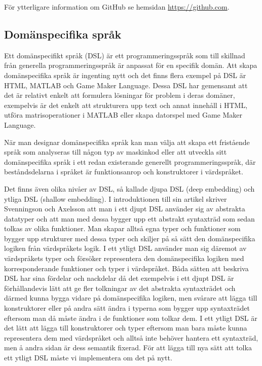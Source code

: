\documentclass[]{article}
\begin{document}
För ytterligare information om GitHub se hemsidan \url{https://github.com}.


\subsection{Domänspecifika språk}
Ett domänspecifikt språk (\gls{DSL}) är ett programmeringsspråk som till
skillnad från generella programmeringsspråk är anpassat för en
specifik domän. Att skapa domänspecifika språk är ingenting nytt och det
finns flera exempel på DSL är HTML, MATLAB och Game Maker Language.
Dessa DSL har gemensamt att det är relativt enkelt att formulera lösningar för
problem i deras domäner, exempelvis är det enkelt att strukturera upp text och
annat innehåll i HTML, utföra matrisoperationer i MATLAB eller skapa datorspel
med Game Maker Language.

När man designar domänspecifika språk kan man välja att skapa ett fristående
språk som analyseras till någon typ av maskinkod eller att utveckla sitt
domänspecifika språk i ett redan existerande generellt programmeringsspråk,
där beståndsdelarna i språket är funktionsanrop och konstruktorer i värdspråket.

Det finns även olika nivåer av DSL, så kallade djupa DSL (deep embedding) och
ytliga DSL (shallow embedding). I introduktionen till sin artikel skriver
Svenningson och Axelsson \cite{Svenningsson2013} att man i ett djupt
DSL använder sig av abstrakta datatyper och att man med dessa bygger upp ett
abstrakt syntaxträd som sedan tolkas av olika funktioner.
Man skapar alltså egna typer och funktioner som bygger upp strukturer med dessa
typer och skiljer på så sätt den domänspecifika logiken från värdspråkets logik.
I ett ytligt DSL använder man sig däremot av värdspråkets typer och försöker
representera den domänspecifika logiken med korresponderande funktioner och
typer i värdspråket.
Båda sätten att beskriva DSL har sina fördelar och nackdelar då det exempelvis
i ett djupt DSL är förhållandevis lätt att ge fler tolkningar av det abstrakta
syntaxträdet och därmed kunna bygga vidare på domänspecifika logiken,
men svårare att lägga till konstruktorer eller på andra sätt ändra i typerna som
bygger upp syntaxträdet eftersom man då måste ändra i de funktioner som tolkar
dem. I ett ytligt DSL är det lätt att lägga till konstruktorer och typer
eftersom man bara måste kunna representera dem med värdspråket och alltså inte
behöver hantera ett syntaxträd, men å andra sidan är dess semantik fixerad.
För att lägga till nya sätt att tolka ett ytligt DSL måste vi implementera
om det på nytt.
\end{document}
